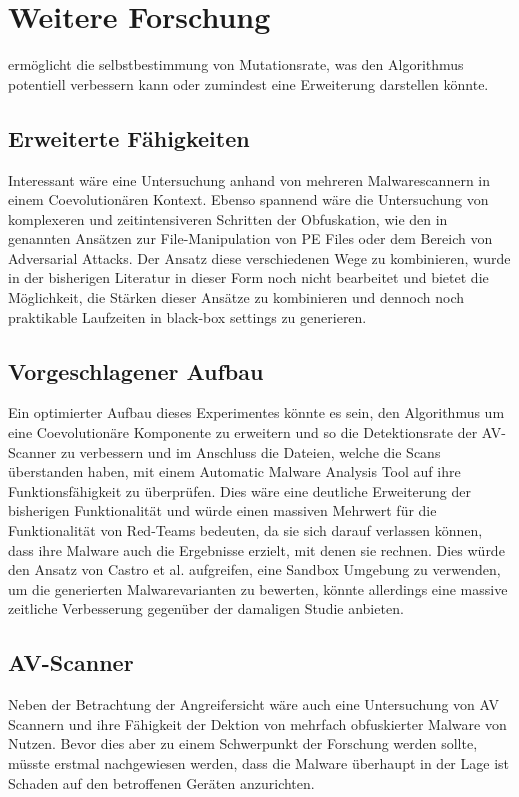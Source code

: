 \section{Weitere Forschung}

\cite{alejandro_2024_a} ermöglicht die selbstbestimmung von Mutationsrate, was den Algorithmus potentiell verbessern kann oder zumindest eine Erweiterung darstellen könnte.

\subsection{Erweiterte Fähigkeiten}
Interessant wäre eine Untersuchung anhand von mehreren Malwarescannern in einem Coevolutionären Kontext. Ebenso spannend wäre die Untersuchung von komplexeren und zeitintensiveren Schritten der Obfuskation, wie den in \cite{demetrio_2024_formalizing} genannten Ansätzen zur File-Manipulation von PE Files oder dem Bereich von Adversarial Attacks. Der Ansatz diese verschiedenen Wege zu kombinieren, wurde in der bisherigen Literatur in dieser Form noch nicht bearbeitet und bietet die Möglichkeit, die Stärken dieser Ansätze zu kombinieren und dennoch noch praktikable Laufzeiten in black-box settings zu generieren.

\subsection{Vorgeschlagener Aufbau}
Ein optimierter Aufbau dieses Experimentes könnte es sein, den Algorithmus um eine Coevolutionäre Komponente zu erweitern und so die Detektionsrate der AV-Scanner zu verbessern und im Anschluss die Dateien, welche die Scans überstanden haben, mit einem Automatic Malware Analysis Tool auf ihre Funktionsfähigkeit zu überprüfen. Dies wäre eine deutliche Erweiterung der bisherigen Funktionalität und würde einen massiven Mehrwert für die Funktionalität von Red-Teams bedeuten, da sie sich darauf verlassen können, dass ihre Malware auch die Ergebnisse erzielt, mit denen sie rechnen. Dies würde den Ansatz von Castro et al. \cite{castro_2019_armed} aufgreifen, eine Sandbox Umgebung zu verwenden, um die generierten Malwarevarianten zu bewerten, könnte allerdings eine massive zeitliche Verbesserung gegenüber der damaligen Studie anbieten.

\subsection{AV-Scanner}
Neben der Betrachtung der Angreifersicht wäre auch eine Untersuchung von AV Scannern und ihre Fähigkeit der Dektion von mehrfach obfuskierter Malware von Nutzen. Bevor dies aber zu einem Schwerpunkt der Forschung werden sollte, müsste erstmal nachgewiesen werden, dass die Malware überhaupt in der Lage ist Schaden auf den betroffenen Geräten anzurichten.
